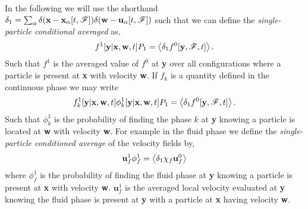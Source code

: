 In the following we will use the shorthand $\delta_1 = \sum_\alpha \delta(\textbf{x} - \textbf{x}_\alpha[t,\mathscr{F}]) \delta(\textbf{w} - \textbf{u}_\alpha[t,\mathscr{F}])$ such that we can define the \textit{single-particle conditional averaged} as, 
\begin{equation*}
    f^1[\textbf{y}|\textbf{x},\textbf{w},t] P_1 = \left<\delta_1 f^0[\textbf{y},\mathscr{F},t]\right>.
\end{equation*}
Such that $f^1$ is the averaged value of $f^0$ at \textbf{y} over all configurations where a particle is present at \textbf{x} with velocity \textbf{w}. 
If $f_k$ is a quantity defined in the continuous phase we may write 
\begin{equation*}
    f^1_k[\textbf{y}|\textbf{x},\textbf{w},t] \phi_k^1[\textbf{y}|\textbf{x},\textbf{w},t]  P_1 = \left<\delta_1 f^0[\textbf{y},\mathscr{F},t]\right>.
\end{equation*}
Such that $\phi_k^1$ is the probability of finding the phase $k$ at \textbf{y} knowing a particle is located at \textbf{w} with velocity \textbf{w}. 
For example in the fluid phase we define the \textit{single-particle conditioned average} of the velocity fields by, 
\begin{equation*}
    \textbf{u}_f^1 \phi_f^1 
    = \left<\delta_1 \chi_f \textbf{u}_f^0\right>
\end{equation*} 
where $\phi_f^1$ is the probability of finding the fluid phase at \textbf{y} knowing a particle is present at \textbf{x} with velocity \textbf{w}. $\textbf{u}_f^1$ is the averaged local velocity evaluated at \textbf{y} knowing the fluid phase is present at \textbf{y} with a particle at \textbf{x} having velocity \textbf{w}. 

